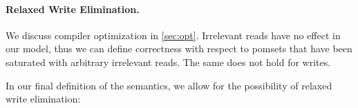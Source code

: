 \paragraph{Relaxed Write Elimination.}
We discuss compiler optimization in \textsection\ref{sec:opt}.  Irrelevant
reads have no effect in our model, thus we can define correctness with
respect to pomsets that have been saturated with arbitrary irrelevant reads.
The same does not hold for writes.

In our final definition of the semantics, we allow for the possibility of
relaxed write elimination:





